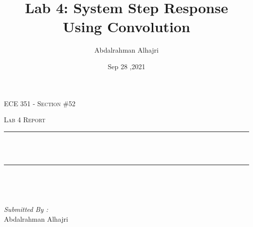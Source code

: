 \documentclass[12pt]{report}
\title{Lab 4: System Step Response Using Convolution }
\author{ Abdalrahman Alhajri}
\date{Sep 28 ,2021}
\makeatletter
\let\thetitle\@title
\makeatother
\begin{document}

\begin{titlepage}
	\centering
    \vspace*{0.5 cm}
\begin{center}    \textsc{\Large   ECE 351 - Section \#52 }\\[2.0 cm]	\end{center}%
	\textsc{\Large Lab 4 Report }\\[0.5 cm]				%
	\rule{\linewidth}{0.2 mm} \\[0.4 cm]
	{ \huge \bfseries \thetitle}\\
	\rule{\linewidth}{0.2 mm} \\[1.5 cm]
	
	\begin{minipage}{0.4\textwidth}
		\begin{flushleft} \large
			\end{flushleft}
			\end{minipage}~
			\begin{minipage}{0.4\textwidth}
            
			\begin{flushright} \large
			\emph{Submitted By :} \\
			Abdalrahman Alhajri  
		\end{flushright}
           
	\end{minipage}\\[2 cm]
	
    
    
    
    
	
\end{titlepage}


\tableofcontents
\pagebreak

\renewcommand{\thesection}{\arabic{section}}
\end{document}
